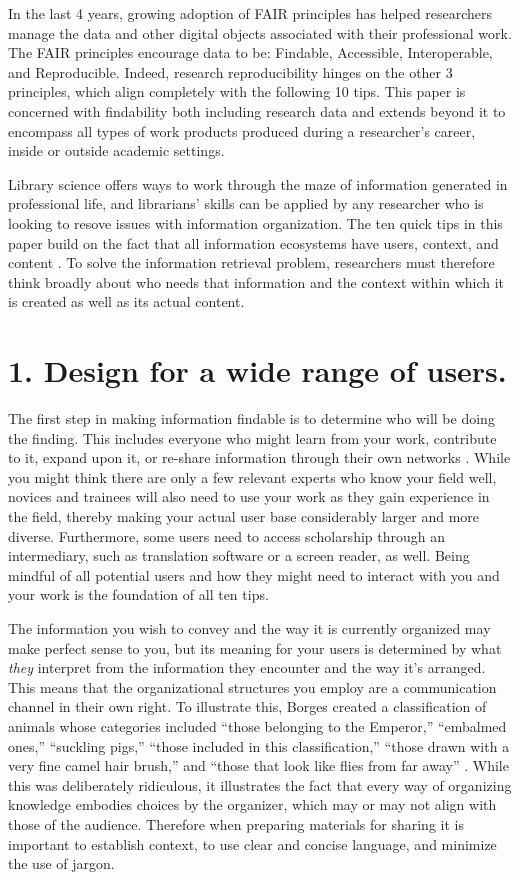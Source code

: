 \documentclass[10pt,letterpaper]{article}
\newcommand{\rulemajor}[1]{\section*{#1}}
\begin{document}
In the last 4 years, growing adoption of FAIR principles \cite{Wilkinson2016} has helped
researchers manage the data and other digital objects associated with their professional
work. The FAIR principles encourage data to be: Findable, Accessible,
Interoperable, and Reproducible. Indeed, research reproducibility hinges
on the other 3 principles, which align completely with the following 10 tips. 
This paper is concerned with findability both including research data and extends beyond
it to encompass all types of work products produced during a researcher's career, 
inside or outside academic settings.

Library science offers ways to work through the maze of information generated in
professional life, and librarians' skills can be applied by any researcher who
is looking to resove issues with information organization. The ten quick tips in 
this paper build on the fact that all information ecosystems have users, context, 
and content \cite{Rosenfeld2015}. To solve the information retrieval problem, 
researchers must therefore think broadly about who needs that information and 
the context within which it is created as well as its actual content.

\rulemajor{1. Design for a wide range of users.}

The first step in making information findable is to determine who will be doing
the finding. This includes everyone who might learn from your work, contribute to it,
expand upon it, or re-share information through their own networks \cite{Covert2014}.
While you might think there are only a few relevant experts who know your field well, 
novices and trainees will also need to use your work as they gain experience in the field,
thereby making your actual user base considerably larger and more diverse. Furthermore,
some users need to access scholarship through an intermediary, such as translation
software or a screen reader, as well. Being mindful of all potential users and how they
might need to interact with you and your work is the foundation of all ten tips.

The information you wish to convey and the way it is currently organized may
make perfect sense to you, but its meaning for your users is determined by what
\emph{they} interpret from the information they encounter and the way it's
arranged. This means that the organizational structures you employ are a
communication channel in their own right. To illustrate this, Borges created a
classification of animals whose categories included ``those belonging to the
Emperor,'' ``embalmed ones,'' ``suckling pigs,'' ``those included in this
classification,'' ``those drawn with a very fine camel hair brush,'' and ``those
that look like flies from far away'' \cite{Borges2000}. While this was
deliberately ridiculous, it illustrates the fact that every way of organizing
knowledge embodies choices by the organizer, which may or may not align with
those of the audience. Therefore when preparing materials for sharing it is important
to establish context, to use clear and concise language, and minimize the use of jargon.
\end{document}

